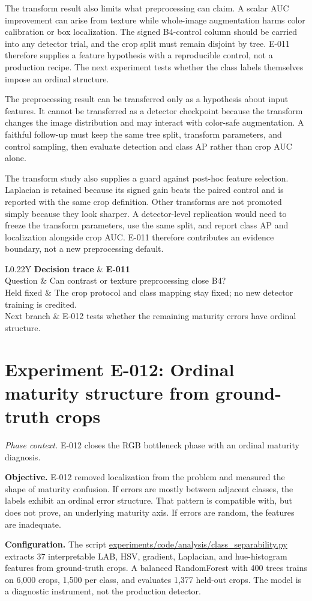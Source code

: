 \documentclass[preprint,12pt]{elsarticle}
\newcommand{\pathcode}[1]{\scriptsize\url{#1}}
\newcommand{\experiment}[2]{\par\medskip\Needspace{7\baselineskip}\section{Experiment #1: #2}}
\newcommand{\decisioncard}[4]{%
\begin{table}[H]\centering\small
\begin{tabularx}{\columnwidth}{L{0.22\columnwidth}Y}
\toprule
\textbf{Decision trace} & \textbf{#1}\\
Question & #2\\
Held fixed & #3\\
Next branch & #4\\
\bottomrule
\end{tabularx}
\end{table}}
\newcommand{\phasecontext}[1]{%
\par\smallskip\noindent\textit{Phase context.} #1\par\smallskip}
\begin{document}
The transform result also limits what preprocessing can claim. A scalar AUC
improvement can arise from texture while whole-image augmentation harms color
calibration or box localization. The signed B4-control column should be
carried into any detector trial, and the crop split must remain disjoint by
tree. E-011 therefore supplies a feature hypothesis with a reproducible
control, not a production recipe. The next experiment tests whether the class
labels themselves impose an ordinal structure.

The preprocessing result can be transferred only as a hypothesis about input
features. It cannot be transferred as a detector checkpoint because the
transform changes the image distribution and may interact with color-safe
augmentation. A faithful follow-up must keep the same tree split, transform
parameters, and control sampling, then evaluate detection and class AP rather
than crop AUC alone.

The transform study also supplies a guard against post-hoc feature selection.
Laplacian is retained because its signed gain beats the paired control and is
reported with the same crop definition. Other transforms are not promoted
simply because they look sharper. A detector-level replication would need to
freeze the transform parameters, use the same split, and report class AP and
localization alongside crop AUC. E-011 therefore contributes an evidence
boundary, not a new preprocessing default.

\decisioncard{E-011}{Can contrast or texture preprocessing close B4?}{The crop protocol and class mapping stay fixed; no new detector training is credited.}{E-012 tests whether the remaining maturity errors have ordinal structure.}
\experiment{E-012}{Ordinal maturity structure from ground-truth crops}
\phasecontext{E-012 closes the RGB bottleneck phase with an ordinal maturity diagnosis.}
\textbf{Objective.} E-012 removed localization from the problem and measured
the shape of maturity confusion. If errors are mostly between adjacent
classes, the labels exhibit an ordinal error structure. That pattern is
compatible with, but does not prove, an underlying maturity axis. If errors
are random, the features are inadequate.

\textbf{Configuration.} The script
\pathcode{experiments/code/analysis/class_separability.py} extracts 37
interpretable LAB, HSV, gradient, Laplacian, and hue-histogram features from
ground-truth crops. A balanced RandomForest with 400 trees trains on 6,000
crops, 1,500 per class, and evaluates 1,377 held-out crops. The model is a
diagnostic instrument, not the production detector.
\end{document}
